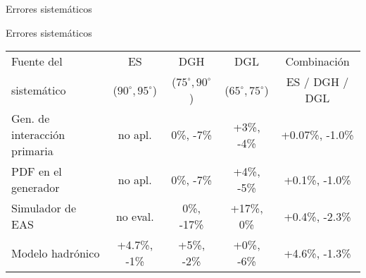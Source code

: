 % 
\begin{frame}{Errores sistem\'aticos}
	\begin{block}{Errores sistem\'aticos}
		\begin{center}
			\renewcommand{\arraystretch}{1.4}
			\scriptsize
				\begin{tabular}{|C{0.2\textwidth}|c|c|c|c|}
				\hline
				Fuente del  & ES        & DGH       & DGL        & Combinaci\'on         \\
				sistemático & ($90^\circ,95^\circ$) & ($75^\circ,90^\circ$) & ($65^\circ,75^\circ$) & ES / DGH / DGL   \\
				\hline
				
				Gen. de interacción primaria    &  no apl. &   0\%, -7\%     &   +3\%, -4\%  & +0.07\%, -1.0\% \\
				
				\hline
				
				PDF en el generador             &  no apl. &   0\%, -7\%     &   +4\%, -5\%  & +0.1\%, -1.0\% \\
				
				\hline
				
				Simulador de EAS                &  no eval. &   0\%, -17\%    &   +17\%, 0\%  & +0.4\%, -2.3\% \\
				
				\hline
				
				Modelo hadrónico                & +4.7\%, -1\%      &  +5\%, -2\%     &   +0\%, -6\%  & +4.6\%, -1.3\% \\
				

\end{tabular}
\end{center}
\end{block}
\end{frame}
